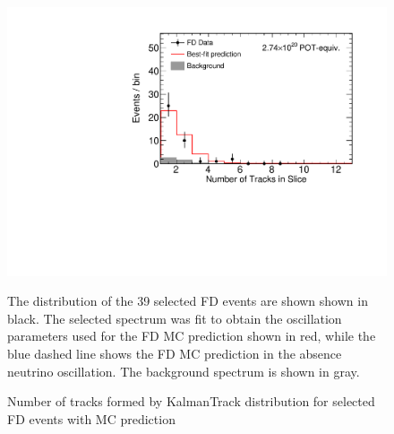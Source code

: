 \begin{figure}
\begin{center}
\includegraphics[width=\textwidth]{figures/results/fd_data_mc_numi_plots/nkal_unblind.pdf}
\end{center}
\caption{  Number of tracks formed by KalmanTrack distribution for selected FD events with MC prediction }{
The distribution of the 39 selected FD events are shown shown in black.
The selected spectrum was fit to obtain the oscillation parameters used
for the FD MC prediction shown in red, while
the blue dashed line shows the FD MC prediction in the absence neutrino
oscillation.
The background spectrum is shown in gray.
}
\label{nkal_unblind}

\end{figure}



